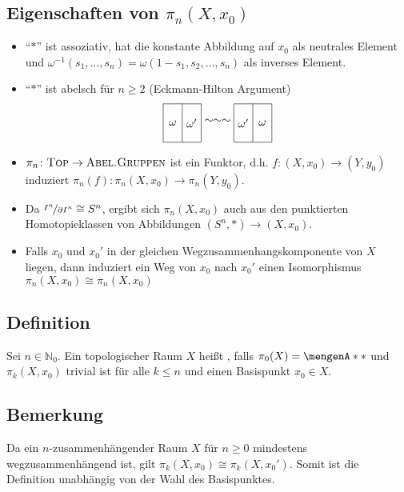 \subsection{Eigenschaften von $\pi_n(X,x_0)$} %
\label{sub:1515}
\begin{itemize}
	\item \enquote{$*$} ist assoziativ, hat die konstante Abbildung auf $x_0$ als neutrales Element und $\omega ^{-1}(s_1,\ldots ,s_n)= \omega(1-s_1,s_2, \ldots ,s_n)$ als inverses
	Element.
	\item \enquote{$*$} ist abelsch für $n \ge 2$ (Eckmann-Hilton Argument) 
	\[
		\begin{tikzpicture}[baseline={(current bounding box.center)},scale=1.2]
			\draw (0,0) rectangle (1,1);
			\draw (0.5,0) -- (0.5,1);
			\node at (0.25,0.5) {$\omega$};
			\node at (0.75,0.5) {$\omega^\prime$};
		\end{tikzpicture}
		\sim
		\sim
		\sim
		\begin{tikzpicture}[baseline={(current bounding box.center)},scale=1.2]
			\draw (0,0) rectangle (1,1);
			\draw (0.5,0) -- (0.5,1);
			\node at (0.25,0.5) {$\omega^\prime$};
			\node at (0.75,0.5) {$\omega$};
		\end{tikzpicture}		
	\]
	\item $\pi_n\colon \textsc{Top}  \to \textsc{Abel.Gruppen}$ ist ein Funktor, d.h. $f \colon (X,x_0) \to (Y,y_0)$ induziert $\pi_n(f) \colon \pi_n(X,x_0) \to \pi_n(Y,y_0)$.
	\item Da $\nicefrac{I^n}{\partial I^n} \cong S^n$, ergibt sich $\pi_n(X,x_0)$ auch aus den punktierten Homotopieklassen von Abbildungen $(S^n,*) \to (X,x_0)$.
	\item Falls $x_0$ und $x_0'$ in der gleichen Wegzusammenhangskomponente von $X$ liegen, dann induziert ein Weg von $x_0$ nach $x_0'$ einen Isomorphismus
	$\pi_n(X,x_0) \cong \pi_n(X,x_0)$
\end{itemize}

\subsection{Definition} %
\label{sub:1516}
Sei $n \in \mathds{N}_0$. Ein topologischer Raum $X$ heißt , falls $\pi_0(X)=\set{*}$ und
$\pi_k(X,x_0)$ trivial ist für alle $k \le n$ und einen Basispunkt $x_0 \in X$.

\subsection{Bemerkung} %
\label{sub:1517}
Da ein $n$-zusammenhängender Raum $X$ für $n \ge 0$ mindestens wegzusammenhängend ist, gilt $\pi_k(X,x_0) \cong \pi_k(X,x_0')$. Somit ist die Definition unabhängig von der 
Wahl des Basispunktes.

